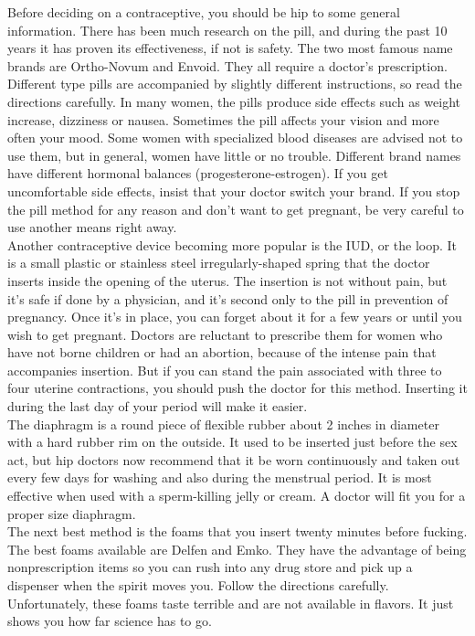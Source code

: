 \documentclass[11pt,twoside,a4paper]{book}
\begin{document}
Before deciding on a contraceptive, you should be hip to some general information. There has been much research on the pill, and during the past 10 years it has proven its effectiveness, if not is safety. The two most famous name brands are Ortho-Novum and Envoid. They all require a doctor's prescription. Different type pills are accompanied by slightly different instructions, so read the directions carefully. In many women, the pills produce side effects such as weight increase, dizziness or nausea. Sometimes the pill affects your vision and more often your mood. Some women with specialized blood diseases are advised not to use them, but in general, women have little or no trouble. Different brand names have different hormonal balances (progesterone-estrogen). If you get uncomfortable side effects, insist that your doctor switch your brand. If you stop the pill method for any reason and don't want to get pregnant, be very careful to use another means right away.~\\

Another contraceptive device becoming more popular is the IUD, or the loop. It is a small plastic or stainless steel irregularly-shaped spring that the doctor inserts inside the opening of the uterus. The insertion is not without pain, but it's safe if done by a physician, and it's second only to the pill in prevention of pregnancy. Once it's in place, you can forget about it for a few years or until you wish to get pregnant. Doctors are reluctant to prescribe them for women who have not borne children or had an abortion, because of the intense pain that accompanies insertion. But if you can stand the pain associated with three to four uterine contractions, you should push the doctor for this method. Inserting it during the last day of your period will make it easier.~\\

The diaphragm is a round piece of flexible rubber about 2 inches in diameter with a hard rubber rim on the outside. It used to be inserted just before the sex act, but hip doctors now recommend that it be worn continuously and taken out every few days for washing and also during the menstrual period. It is most effective when used with a sperm-killing jelly or cream. A doctor will fit you for a proper size diaphragm.~\\

The next best method is the foams that you insert twenty minutes before fucking. The best foams available are Delfen and Emko. They have the advantage of being nonprescription items so you can rush into any drug store and pick up a dispenser when the spirit moves you. Follow the directions carefully. Unfortunately, these foams taste terrible and are not available in flavors. It just shows you how far science has to go.~\\
\end{document}
